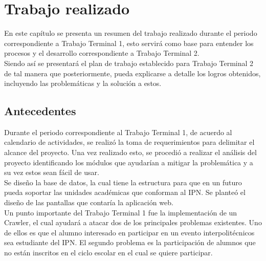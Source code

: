 \chapter{Trabajo realizado}

	\noindent En este capítulo se presenta un resumen del trabajo realizado durante el periodo correspondiente a Trabajo Terminal 1, esto servirá como base para entender los procesos y el desarrollo correspondiente a Trabajo Terminal 2.\\
	\noindent Siendo así se presentará el plan de trabajo establecido para Trabajo Terminal 2 de tal manera que posteriormente, pueda explicarse a detalle los logros obtenidos, incluyendo las problemáticas y la solución a estos. \\
	
	\section{Antecedentes}
	\noindent Durante el periodo correspondiente al Trabajo Terminal 1, de acuerdo al calendario de actividades, se realizó la toma de requerimientos para delimitar el alcance del proyecto. Una vez realizado esto, se procedió a realizar el análisis del proyecto identificando los módulos que ayudarían a mitigar la problemática y a su vez estos sean fácil de usar.\\
	Se diseño la base de datos, la cual tiene la estructura para que en un futuro pueda soportar las unidades académicas que conforman al IPN. Se planteó el diseño de las pantallas que contaría la aplicación web.\\
	
	\noindent Un punto importante del Trabajo Terminal 1 fue la implementación de un Crawler, el cual ayudará a atacar dos de los principales problemas existentes. Uno de ellos es que el alumno interesado en participar en un evento interpolitécnicos sea estudiante del IPN. El segundo problema es la participación de alumnos que no están inscritos en el ciclo escolar en el cual se quiere participar.
	
